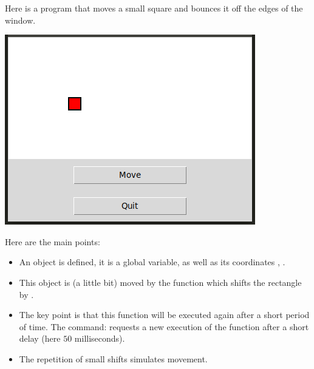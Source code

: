 \documentclass[11pt,class=report,crop=false]{standalone}
\begin{document}
Here is a program that moves a small square and bounces it off the edges of the window.

\begin{center}
\includegraphics[scale=\myscale,scale=0.5]{../blocks/screen-blocks-lesson-move-en}
\end{center}

Here are the main points:
\begin{itemize}
  \item An object  is defined, it is a global variable, as well as its coordinates , .
  
  \item This object is (a little bit) moved by the function  which shifts the rectangle by .
    
  \item The key point is that this function will be executed again after a short period of time. The command: 
  requests a new execution of the function  after a short delay (here $50$ milliseconds).
  
  \item The repetition of small shifts simulates movement.
\end{itemize}
\end{document}
